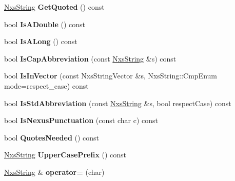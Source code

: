 \begin{DoxyCompactItemize}
\item 
\hypertarget{classNxsString_a94c43a042fdd27d06a69beb55abfb09b}{
\hyperlink{classNxsString}{NxsString} {\bfseries GetQuoted} () const }
\label{classNxsString_a94c43a042fdd27d06a69beb55abfb09b}

\item 
\hypertarget{classNxsString_a75e55f7b719838d83e6af1581170dbd9}{
bool {\bfseries IsADouble} () const }
\label{classNxsString_a75e55f7b719838d83e6af1581170dbd9}

\item 
\hypertarget{classNxsString_a71b060209ee38eb8192397ba4459c670}{
bool {\bfseries IsALong} () const }
\label{classNxsString_a71b060209ee38eb8192397ba4459c670}

\item 
\hypertarget{classNxsString_a9b55e9e8030de880de4a9ef2a9c4f3ce}{
bool {\bfseries IsCapAbbreviation} (const \hyperlink{classNxsString}{NxsString} \&s) const }
\label{classNxsString_a9b55e9e8030de880de4a9ef2a9c4f3ce}

\item 
\hypertarget{classNxsString_af4db407b6aad6b6f03fbad6b50f200d2}{
bool {\bfseries IsInVector} (const NxsStringVector \&s, NxsString::CmpEnum mode=respect\_\-case) const }
\label{classNxsString_af4db407b6aad6b6f03fbad6b50f200d2}

\item 
\hypertarget{classNxsString_acaf129f876d1a0471e029e74d79535f8}{
bool {\bfseries IsStdAbbreviation} (const \hyperlink{classNxsString}{NxsString} \&s, bool respectCase) const }
\label{classNxsString_acaf129f876d1a0471e029e74d79535f8}

\item 
\hypertarget{classNxsString_a3c511d513ba1355d94d43b67e263d812}{
bool {\bfseries IsNexusPunctuation} (const char c) const }
\label{classNxsString_a3c511d513ba1355d94d43b67e263d812}

\item 
\hypertarget{classNxsString_ae480dfaa6d3054bc612293cba9821738}{
bool {\bfseries QuotesNeeded} () const }
\label{classNxsString_ae480dfaa6d3054bc612293cba9821738}

\item 
\hypertarget{classNxsString_a32f73ef4a6de84f9f5cf44350bde828d}{
\hyperlink{classNxsString}{NxsString} {\bfseries UpperCasePrefix} () const }
\label{classNxsString_a32f73ef4a6de84f9f5cf44350bde828d}

\item 
\hypertarget{classNxsString_a925aa5c1fd14d364b411e864ab9b2604}{
\hyperlink{classNxsString}{NxsString} \& {\bfseries operator=} (char)}
\label{classNxsString_a925aa5c1fd14d364b411e864ab9b2604}


\end{DoxyCompactItemize}
